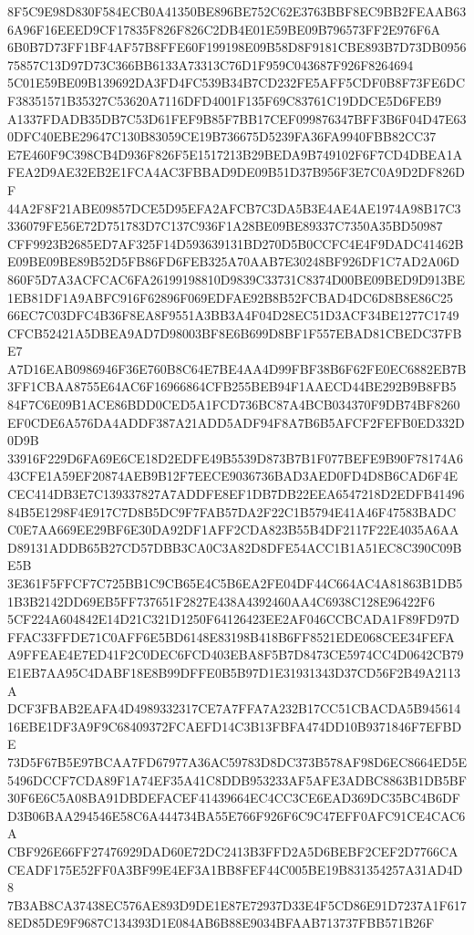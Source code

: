 \documentclass[UTF8,fontset=fandol,zihao=-4,a4paper]{ctexart}
\begin{document}
{{8F5C9E98D830F584ECB0A41350BE896BE752C62E3763BBF8EC9BB2FEAAB636A96F16EEED9CF17835F826F826C2DB4E01E59BE09B796573FF2E976F6A
6B0B7D73FF1BF4AF57B8FFE60F199198E09B58D8F9181CBE893B7D73DB095675857C13D97D73C366BB6133A73313C76D1F959C043687F926F8264694
5C01E59BE09B139692DA3FD4FC539B34B7CD232FE5AFF5CDF0B8F73FE6DCF38351571B35327C53620A7116DFD4001F135F69C83761C19DDCE5D6FEB9
A1337FDADB35DB7C53D61FEF9B85F7BB17CEF099876347BFF3B6F04D47E630DFC40EBE29647C130B83059CE19B736675D5239FA36FA9940FBB82CC37
E7E460F9C398CB4D936F826F5E1517213B29BEDA9B749102F6F7CD4DBEA1AFEA2D9AE32EB2E1FCA4AC3FBBAD9DE09B51D37B956F3E7C0A9D2DF826DF
44A2F8F21ABE09857DCE5D95EFA2AFCB7C3DA5B3E4AE4AE1974A98B17C3336079FE56E72D751783D7C137C936F1A28BE09BE89337C7350A35BD50987
CFF9923B2685ED7AF325F14D593639131BD270D5B0CCFC4E4F9DADC41462BE09BE09BE89B52D5FB86FD6FEB325A70AAB7E30248BF926DF1C7AD2A06D
860F5D7A3ACFCAC6FA26199198810D9839C33731C8374D00BE09BED9D913BE1EB81DF1A9ABFC916F62896F069EDFAE92B8B52FCBAD4DC6D8B8E86C25
66EC7C03DFC4B36F8EA8F9551A3BB3A4F04D28EC51D3ACF34BE1277C1749CFCB52421A5DBEA9AD7D98003BF8E6B699D8BF1F557EBAD81CBEDC37FBE7
A7D16EAB0986946F36E760B8C64E7BE4AA4D99FBF38B6F62FE0EC6882EB7B3FF1CBAA8755E64AC6F16966864CFB255BEB94F1AAECD44BE292B9B8FB5
84F7C6E09B1ACE86BDD0CED5A1FCD736BC87A4BCB034370F9DB74BF8260EF0CDE6A576DA4ADDF387A21ADD5ADF94F8A7B6B5AFCF2FEFB0ED332D0D9B
33916F229D6FA69E6CE18D2EDFE49B5539D873B7B1F077BEFE9B90F78174A643CFE1A59EF20874AEB9B12F7EECE9036736BAD3AED0FD4D8B6CAD6F4E
CEC414DB3E7C139337827A7ADDFE8EF1DB7DB22EEA6547218D2EDFB4149684B5E1298F4E917C7D8B5DC9F7FAB57DA2F22C1B5794E41A46F47583BADC
C0E7AA669EE29BF6E30DA92DF1AFF2CDA823B55B4DF2117F22E4035A6AAD89131ADDB65B27CD57DBB3CA0C3A82D8DFE54ACC1B1A51EC8C390C09BE5B
3E361F5FFCF7C725BB1C9CB65E4C5B6EA2FE04DF44C664AC4A81863B1DB51B3B2142DD69EB5FF737651F2827E438A4392460AA4C6938C128E96422F6
5CF224A604842E14D21C321D1250F64126423EE2AF046CCBCADA1F89FD97DFFAC33FFDE71C0AFF6E5BD6148E83198B418B6FF8521EDE068CEE34FEFA
A9FFEAE4E7ED41F2C0DEC6FCD403EBA8F5B7D8473CE5974CC4D0642CB79E1EB7AA95C4DABF18E8B99DFFE0B5B97D1E31931343D37CD56F2B49A2113A
DCF3FBAB2EAFA4D4989332317CE7A7FFA7A232B17CC51CBACDA5B94561416EBE1DF3A9F9C68409372FCAEFD14C3B13FBFA474DD10B9371846F7EFBDE
73D5F67B5E97BCAA7FD67977A36AC59783D8DC373B578AF98D6EC8664ED5E5496DCCF7CDA89F1A74EF35A41C8DDB953233AF5AFE3ADBC8863B1DB5BF
30F6E6C5A08BA91DBDEFACEF41439664EC4CC3CE6EAD369DC35BC4B6DFD3B06BAA294546E58C6A444734BA55E766F926F6C9C47EFF0AFC91CE4CAC6A
CBF926E66FF27476929DAD60E72DC2413B3FFD2A5D6BEBF2CEF2D7766CACEADF175E52FF0A3BF99E4EF3A1BB8FEF44C005BE19B831354257A31AD4D8
7B3AB8CA37438EC576AE893D9DE1E87E72937D33E4F5CD86E91D7237A1F6178ED85DE9F9687C134393D1E084AB6B88E9034BFAAB713737FBB571B26F
}}
\end{document}
